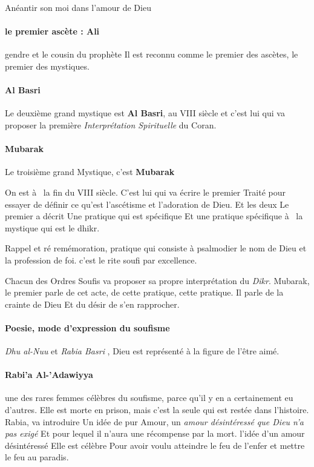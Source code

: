 \begin{Def}[fana]
    Anéantir son moi dans l'amour de Dieu
\end{Def}



\paragraph{le premier ascète : Ali} gendre et le cousin du prophète 
Il est reconnu comme le premier des ascètes, le premier des mystiques.

\paragraph{Al Basri}
Le deuxième grand mystique est \textbf{Al Basri},  au VIII siècle et c'est lui qui  va proposer la première 
\textit{Interprétation Spirituelle }
du Coran.

\paragraph{Mubarak}
Le troisième grand 
Mystique, c'est \textbf{Mubarak} 
 
On est à  la fin du VIII  siècle.  C'est lui qui  va écrire le premier 
Traité pour essayer de définir ce qu'est l'ascétisme et l'adoration 
de Dieu.
Et les deux  Le premier a décrit 
Une pratique qui  est spécifique 
Et une pratique spécifique à  la mystique qui  est le dhikr.  
\begin{Def}[Dhikr]
    Rappel et ré remémoration, pratique qui consiste à psalmodier le nom de Dieu et la profession de foi. c'est le rite soufi par excellence.
\end{Def}
Chacun des 
Ordres 
Soufis 
va proposer  sa propre interprétation du \textit{Dikr}. Mubarak, le premier parle de cet acte, de cette pratique, cette pratique. Il parle 
de la crainte de Dieu 
Et du désir de 
s'en rapprocher.



\paragraph{Poesie, mode d'expression du soufisme} \textit{Dhu al-Nuu} et \textit{Rabia Basri} , Dieu est représenté à la figure de l'être aimé.

\paragraph{Rabi'a Al-'Adawiyya} 
une des rares femmes célèbres du soufisme, parce qu'il y en a certainement eu d'autres. 
Elle est morte en prison, mais c'est la 
seule 
qui  est restée dans l'histoire.
Rabia,   va introduire 
Un idée de pur 
Amour, un \textit{amour désintéressé que Dieu n'a pas 
exigé }
Et pour lequel il n'aura une récompense par la mort.
 l'idée d'un amour désintéressé 
Elle est célèbre 
Pour avoir voulu 
atteindre 
le feu de l'enfer et mettre le feu au paradis. 


